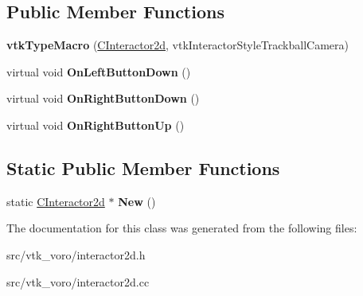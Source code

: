 \subsection*{Public Member Functions}
\begin{DoxyCompactItemize}
\item 
{\bfseries vtk\+Type\+Macro} (\hyperlink{classimr_1_1CInteractor2d}{C\+Interactor2d}, vtk\+Interactor\+Style\+Trackball\+Camera)\hypertarget{classimr_1_1CInteractor2d_aeee785aedc936d4f8ec078795bed777f}{}\label{classimr_1_1CInteractor2d_aeee785aedc936d4f8ec078795bed777f}

\item 
virtual void {\bfseries On\+Left\+Button\+Down} ()\hypertarget{classimr_1_1CInteractor2d_a1a4d3fa243f5d22d0246d813a38a7d84}{}\label{classimr_1_1CInteractor2d_a1a4d3fa243f5d22d0246d813a38a7d84}

\item 
virtual void {\bfseries On\+Right\+Button\+Down} ()\hypertarget{classimr_1_1CInteractor2d_a6abf7dd50db525b7576d0238a4d473be}{}\label{classimr_1_1CInteractor2d_a6abf7dd50db525b7576d0238a4d473be}

\item 
virtual void {\bfseries On\+Right\+Button\+Up} ()\hypertarget{classimr_1_1CInteractor2d_afa221ec59b1c647b694f32bd2d23240d}{}\label{classimr_1_1CInteractor2d_afa221ec59b1c647b694f32bd2d23240d}

\end{DoxyCompactItemize}
\subsection*{Static Public Member Functions}
\begin{DoxyCompactItemize}
\item 
static \hyperlink{classimr_1_1CInteractor2d}{C\+Interactor2d} $\ast$ {\bfseries New} ()\hypertarget{classimr_1_1CInteractor2d_ac93e066424db79d8ddca6dec9f8146c9}{}\label{classimr_1_1CInteractor2d_ac93e066424db79d8ddca6dec9f8146c9}

\end{DoxyCompactItemize}


The documentation for this class was generated from the following files\+:\begin{DoxyCompactItemize}
\item 
src/vtk\+\_\+voro/interactor2d.\+h\item 
src/vtk\+\_\+voro/interactor2d.\+cc\end{DoxyCompactItemize}
